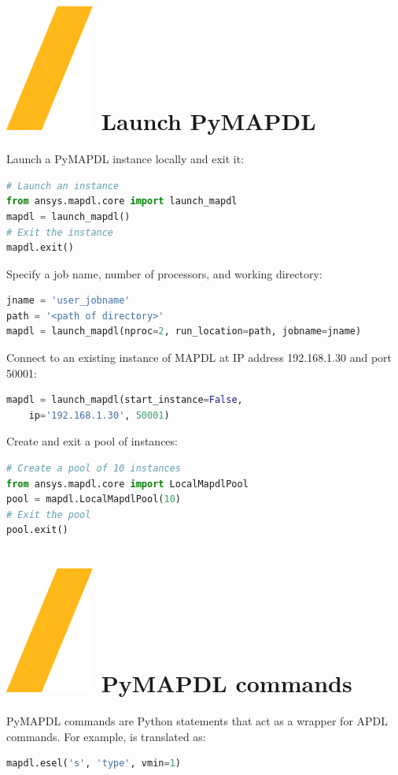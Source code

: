 \documentclass[9pt,landscape]{article}
\begin{document}
\begin{multicols}{3}
\setlength{\premulticols}{1pt}
\setlength{\postmulticols}{1pt}
\setlength{\multicolsep}{1pt}
\setlength{\columnsep}{2pt}

\section{\includegraphics[height=\fontcharht\font`\S]{slash.png} Launch PyMAPDL}
Launch a PyMAPDL instance locally and exit it:
\begin{lstlisting}[language=Python]
# Launch an instance
from ansys.mapdl.core import launch_mapdl
mapdl = launch_mapdl()
# Exit the instance
mapdl.exit()
\end{lstlisting}

Specify a job name, number of processors, and working directory:
\begin{lstlisting}[language=Python]
jname = 'user_jobname'
path = '<path of directory>'
mapdl = launch_mapdl(nproc=2, run_location=path, jobname=jname)
\end{lstlisting}

Connect to an existing instance of MAPDL at IP address 192.168.1.30 and port 50001:
\begin{lstlisting}[language=Python]
mapdl = launch_mapdl(start_instance=False,
    ip='192.168.1.30', 50001)
\end{lstlisting}
Create and exit a pool of instances:
\begin{lstlisting}[language=Python]
# Create a pool of 10 instances
from ansys.mapdl.core import LocalMapdlPool
pool = mapdl.LocalMapdlPool(10)
# Exit the pool
pool.exit()
\end{lstlisting}

\section{\includegraphics[height=\fontcharht\font`\S]{slash.png} PyMAPDL commands}
PyMAPDL commands are Python statements that act as a wrapper for APDL commands. For example,  is translated as:
\begin{lstlisting}[language=Python]
mapdl.esel('s', 'type', vmin=1) 
\end{lstlisting}


\end{multicols}
\end{document}
